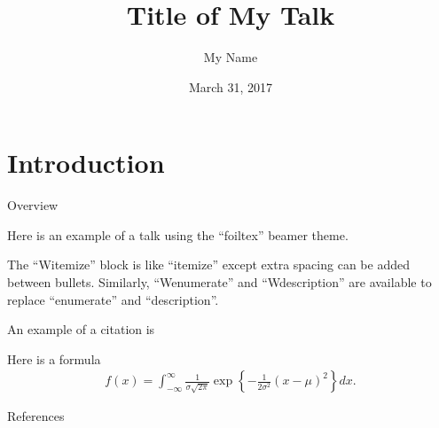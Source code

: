 \documentclass[10pt,final,xcolor=svgnames]{beamer}
\begin{document}
\title[Short title]{Title of My Talk}
\author[My Name]{My Name}
\date[3/31/2017]{March 31, 2017}

\begin{frame}[plain]
\maketitle
\vspace{-1em}
\begin{center}
\vspace{1em}
\end{center}
\end{frame}

\section{Introduction}
\begin{frame}{Overview}
\begin{Witemize}[10pt]
\item Here is an example of a talk using the ``foiltex'' beamer theme.
\item The ``Witemize'' block is like ``itemize'' except extra spacing can
be added between bullets. Similarly, ``Wenumerate'' and ``Wdescription'' are
available to replace ``enumerate'' and ``description''.
\item An example of a citation is \citep{cran}
\item Here is a formula
%
\begin{align*}
f(x) = \int_{-\infty}^\infty \frac{1}{\sigma \sqrt{2 \pi}}
\exp\left\{ -\frac{1}{2 \sigma^2} (x - \mu)^2  \right\} dx.
\end{align*}

\end{Witemize}
\end{frame}

\begin{frame}{References}
\small


\end{frame}

\appendix
\end{document}
